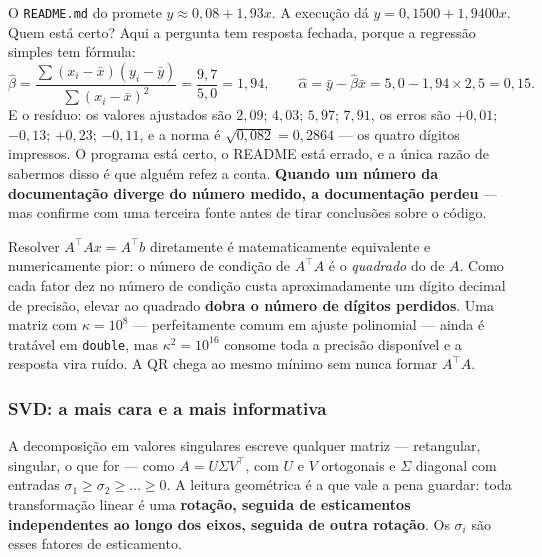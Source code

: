 \begin{armadilha}
O \texttt{README.md} do  promete
$y \approx 0{,}08 + 1{,}93x$. A execução dá $y = 0{,}1500 + 1{,}9400x$. Quem
está certo? Aqui a pergunta tem resposta fechada, porque a regressão simples tem
fórmula:
\[
\hat{\beta} = \frac{\sum (x_i - \bar{x})(y_i - \bar{y})}{\sum (x_i - \bar{x})^2}
            = \frac{9{,}7}{5{,}0} = 1{,}94,
\qquad
\hat{\alpha} = \bar{y} - \hat{\beta}\bar{x} = 5{,}0 - 1{,}94 \times 2{,}5 = 0{,}15 .
\]
E o resíduo: os valores ajustados são $2{,}09$; $4{,}03$; $5{,}97$; $7{,}91$,
os erros são $+0{,}01$; $-0{,}13$; $+0{,}23$; $-0{,}11$, e a norma é
$\sqrt{0{,}082} = 0{,}2864$ --- os quatro dígitos impressos. O programa está
certo, o README está errado, e a única razão de sabermos disso é que alguém
refez a conta. \textbf{Quando um número da documentação diverge do número
medido, a documentação perdeu} --- mas confirme com uma terceira fonte antes de
tirar conclusões sobre o código.
\end{armadilha}

\begin{porque}
Resolver $A^\top A x = A^\top b$ diretamente é matematicamente equivalente e
numericamente pior: o número de condição de $A^\top A$ é o \emph{quadrado} do de
$A$. Como cada fator dez no número de condição custa aproximadamente um dígito
decimal de precisão, elevar ao quadrado \textbf{dobra o número de dígitos
perdidos}. Uma matriz com $\kappa = 10^8$ --- perfeitamente comum em ajuste
polinomial --- ainda é tratável em \texttt{double}, mas $\kappa^2 = 10^{16}$
consome toda a precisão disponível e a resposta vira ruído. A QR chega ao mesmo
mínimo sem nunca formar $A^\top A$.
\end{porque}

\subsubsection{SVD: a mais cara e a mais informativa}

A decomposição em valores singulares escreve qualquer matriz --- retangular,
singular, o que for --- como $A = U \Sigma V^\top$, com $U$ e $V$ ortogonais e
$\Sigma$ diagonal com entradas $\sigma_1 \geq \sigma_2 \geq \dots \geq 0$. A
leitura geométrica é a que vale a pena guardar: toda transformação linear é uma
\textbf{rotação, seguida de esticamentos independentes ao longo dos eixos,
seguida de outra rotação}. Os $\sigma_i$ são esses fatores de esticamento.

